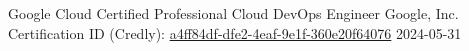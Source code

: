 \awarditem
    {Google Cloud Certified Professional Cloud DevOps Engineer}
    {Google, Inc.}
    {Certification ID (Credly): \href{https://www.credly.com/badges/a4ff84df-dfe2-4eaf-9e1f-360e20f64076}{a4ff84df-dfe2-4eaf-9e1f-360e20f64076}}
    {2024-05-31}